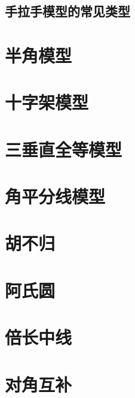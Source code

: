 \documentclass[10pt,twocolumn]{ctexart}
\begin{document}
\subsection{手拉手模型的常见类型}
\section{半角模型}
\section{十字架模型}
\section{三垂直全等模型}
\section{角平分线模型}
\section{胡不归}
\section{阿氏圆}
\section{倍长中线}
\section{对角互补}
\end{document}
